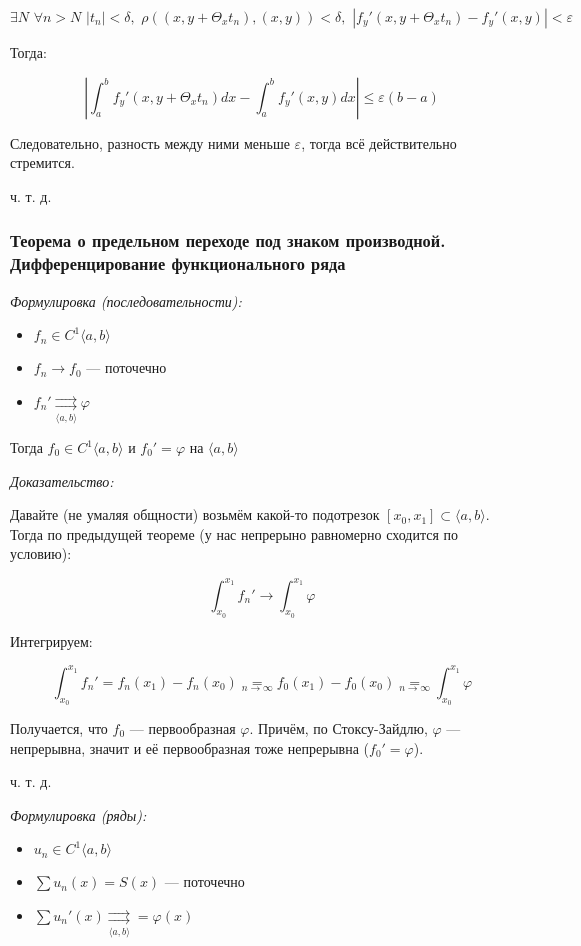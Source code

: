 \documentclass{article}
\def\dbl{\,\,}
\def\rsh#1{\underset{#1}{\rightrightarrows}}
\begin{document}
\[\exists N \dbl \forall n > N \dbl |t_n| < \delta, \dbl \rho((x, y + \Theta_x t_n), (x, y)) < \delta, \dbl
\left|f_y'(x, y + \Theta_x t_n) - {f_y'(x, y)}\right| < \varepsilon\]

Тогда: 

\[\left|\int_a^b{f_y'(x, y + \Theta_x t_n) dx} - \int_a^b{f_y'(x, y) dx}\right| \le \varepsilon (b - a)\]

Следовательно, разность между ними меньше $\varepsilon$, тогда всё действительно стремится.

ч. т. д.

\subsubsection{Теорема о предельном переходе под знаком производной. Дифференцирование функционального ряда}
\textit{Формулировка (последовательности):}

\begin{itemize}
    \item $f_n \in C^1\langle a, b \rangle$
    \item $f_n \rightarrow f_0$ --- поточечно
    \item $f_n' \rsh{\langle a, b \rangle} \varphi$
\end{itemize}

Тогда $f_0 \in C^1\langle a, b \rangle$ и $f_0' = \varphi$ на $\langle a, b \rangle$

\textit{Доказательство:}

Давайте (не умаляя общности) возьмём какой-то подотрезок $[x_0, x_1] \subset \langle a, b \rangle$. Тогда по предыдущей теореме (у нас непрерыно равномерно сходится по условию):

\[\int_{x_0}^{x_1} f_n' \longrightarrow \int_{x_0}^{x_1} \varphi \]

Интегрируем:

\[\int_{x_0}^{x_1} f_n' = f_n(x_1) - f_n(x_0) \underset{n \rightarrow \infty}{=} f_0(x_1) - f_0(x_0) \underset{n \rightarrow \infty}{=} \int_{x_0}^{x_1} \varphi \]

Получается, что $f_0$ --- первообразная $\varphi$. Причём, по Стоксу-Зайдлю, $\varphi$ --- непрерывна, значит и её первообразная тоже непрерывна ($f_0' = \varphi$).

ч. т. д. 

\textit{Формулировка (ряды):}

\begin{itemize}
    \item $u_n \in C^1\langle a, b \rangle$
    \item $\sum u_n(x) = S(x)$ --- поточечно
    \item $\sum u_n'(x) \rsh{\langle a, b \rangle} = \varphi(x)$
\end{itemize}
\end{document}
